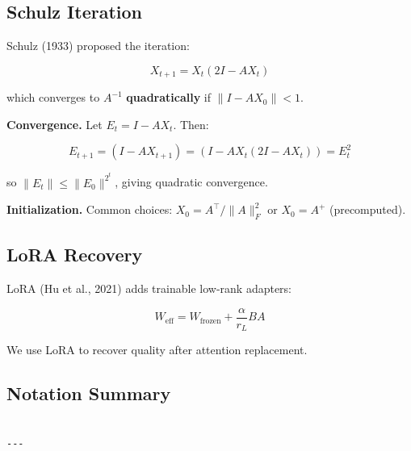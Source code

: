 \subsection{Schulz Iteration}

Schulz (1933) proposed the iteration:

\begin{equation}
X_{t+1} = X_t (2I - A X_t)
\end{equation}

which converges to $A^{-1}$ \textbf{quadratically} if $\|I - A X_0\| < 1$.

\textbf{Convergence.} Let $E_t = I - A X_t$. Then:

\begin{equation}
E_{t+1} = (I - A X_{t+1}) = (I - A X_t (2I - A X_t)) = E_t^2
\end{equation}

so $\|E_t\| \le \|E_0\|^{2^t}$, giving quadratic convergence.

\textbf{Initialization.} Common choices: $X_0 = A^\top / \|A\|_F^2$ or $X_0 = A^+$ 
(precomputed).

\subsection{LoRA Recovery}

LoRA (Hu et al., 2021) adds trainable low-rank adapters:

\begin{equation}
W_\text{eff} = W_\text{frozen} + \frac{\alpha}{r_L} B A
\end{equation}

We use LoRA to recover quality after attention replacement.

\subsection{Notation Summary}

\begin{lstlisting}

---
\end{lstlisting}